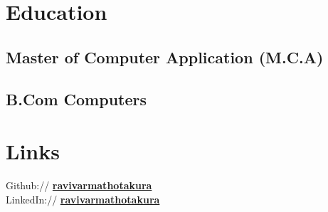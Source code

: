 \documentclass[letterpaper]{deedy-resume} %
\begin{document}
\begin{minipage}[t]{0.33\textwidth}
\sectionspace %


\section{Education} 

\subsection{Master of Computer Application (M.C.A)}

\sectionspace %


\subsection{B.Com Computers}

\sectionspace %



\section{Links} 

Github:// \href{https://github.com/ravivarmathotakura}{\bf ravivarmathotakura} \\
LinkedIn:// \href{https://www.linkedin.com/in/ravivarmathotakura/}{\bf ravivarmathotakura}

\sectionspace %


\end{minipage} %
\hfill
%
%
\end{document}
